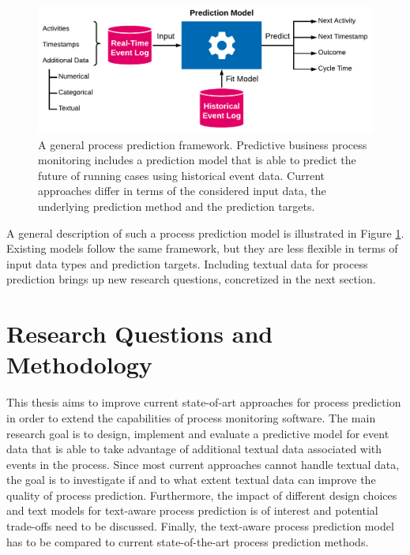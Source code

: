 \begin{figure}[htbp!]
	\centering
	\includegraphics[width=\textwidth]{figures/problem-description}
	\caption[A general process prediction framework]{A general process prediction framework. Predictive business process monitoring includes a prediction model that is able to predict the future of running cases using historical event data. Current approaches differ in terms of the considered input data, the underlying prediction method and the prediction targets.}
	\label{fig:/problem-description}
\end{figure}

A general description of such a process prediction model is illustrated in Figure \ref{fig:/problem-description}.
Existing models follow the same framework, but they are less flexible in terms of input data types and prediction targets.
Including textual data for process prediction brings up new research questions, concretized in the next section.

\section{Research Questions and Methodology}\label{sec:methodology}

This thesis aims to improve current state-of-art approaches for process prediction in order to extend the capabilities of process monitoring software.
The main research goal is to design, implement and evaluate a predictive model for event data that is able to take advantage of additional textual data associated with events in the process.
Since most current approaches cannot handle textual data, the goal is to investigate if and to what extent textual data can improve the quality of process prediction.
Furthermore, the impact of different design choices and text models for text-aware process prediction is of interest and potential trade-offs need to be discussed.
Finally, the text-aware process prediction model has to be compared to current state-of-the-art process prediction methods.


